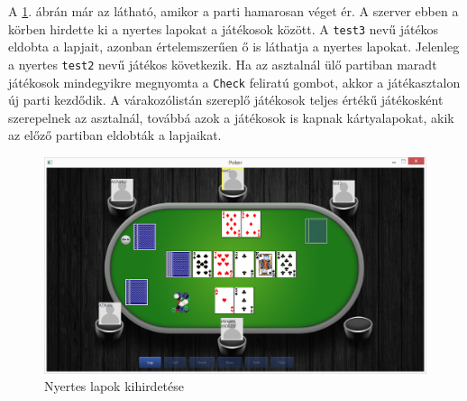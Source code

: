A \ref{fig:parti_4}. ábrán már az látható, amikor a parti hamarosan véget ér. A szerver ebben a körben hirdette ki a nyertes lapokat a játékosok között. A \texttt{test3} nevű játékos eldobta a lapjait, azonban értelemszerűen ő is láthatja a nyertes lapokat. Jelenleg a nyertes \texttt{test2} nevű játékos következik. Ha az asztalnál ülő partiban maradt játékosok mindegyikre megnyomta a \texttt{Check} feliratú gombot, akkor a játékasztalon új parti kezdődik. A várakozólistán szereplő játékosok teljes értékű játékosként szerepelnek az asztalnál, továbbá azok a játékosok is kapnak kártyalapokat, akik az előző partiban eldobták a lapjaikat.
 \begin{figure}[h!]
  \caption{Nyertes lapok kihirdetése}
  \label{fig:parti_4}
  \centering
    \includegraphics[width=\linewidth]{user-documentation/images/parti/parti_4.jpg}
\end{figure}

\clearpage
